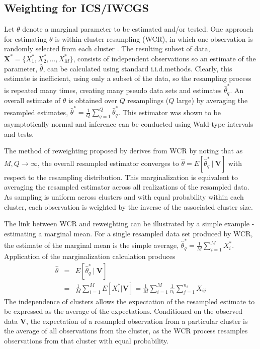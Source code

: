 \subsection{Weighting for ICS/IWCGS} \label{ss:ICS}
Let $\theta$ denote a marginal parameter to be estimated and/or tested. One approach for estimating $\theta$ is within-cluster resampling (WCR), in which one observation is randomly selected from each cluster \citep{hoffman01}. The resulting subset of data, $\bm{X}^{*}=\{X_{1}^{*}, X_{2}^{*}, \ldots, X_{M}^{*}\}$, consists of independent observations so an estimate of the parameter, $\hat{\theta}$, can be calculated using standard i.i.d.\@ methods. Clearly, this estimate is inefficient, using only a subset of the data, so the resampling process is repeated many times, creating many pseudo data sets and estimates $\hat{\theta}_q^*$. An overall estimate of $\theta$ is obtained over $Q$ resamplings ($Q$ large) by averaging the resampled estimates, $\hat{\theta}^{*}=\frac{1}{Q}\sum_{q=1}^{Q}\hat{\theta}_{q}^*$. This estimator was shown to be asymptotically normal and inference can be conducted using Wald-type intervals and tests.

The method of reweighting proposed by \citet{williamson03} derives from WCR by noting that as $M,Q \to \infty$, the overall resampled estimator converges to $\hat{\theta} = E\left[\hat{\theta}_{q}^{*} ~|~ \bm{V}\right]$ with respect to the resampling distribution. This marginalization is equivalent to averaging the resampled estimator across all realizations of the resampled data. As sampling is uniform across clusters and with equal probability within each cluster, each observation is weighted by the inverse of the associated cluster size.

The link between WCR and reweighting can be illustrated by a simple example - estimating a marginal mean. For a single resampled data set produced by WCR, the estimate of the marginal mean is the simple average, $\hat{\theta}_{q}^{*}=\frac{1}{M} \sum_{i=1}^{M} X_i^*$. Application of the marginalization calculation produces 
\begin{eqnarray*}
	\hat{\theta} & = & E \left[ \hat{\theta}_{q}^* ~|~ \bm{V}\right] \nonumber \\
	& = & \frac{1}{M} \sum_{i=1}^{M} E \left[ X_{i}^{*} | \bm{V} \right] =  \frac{1}{M} \sum_{i=1}^{M} \frac{1}{n_{i}} \sum_{j=1}^{n_{i}} X_{ij}
\end{eqnarray*}
The independence of clusters allows the expectation of the resampled estimate to be expressed as the average of the expectations. Conditioned on the observed data $\bm{V}$, the expectation of a resampled observation from a particular cluster is the average of all observations from the cluster, as the WCR process resamples observations from that cluster with equal probability. 

